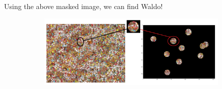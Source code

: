 \documentclass[12pt, oneside]{article}
\begin{document}
Using the above masked image, we can find Waldo!

\begin{figure}[H]
    \centering
    \begin{subfigure}[b]{1\textwidth}
        \centering
        \includegraphics[width=\textwidth]{imgs/waldo_found.png}
    \end{subfigure}
\end{figure}
\end{document}
